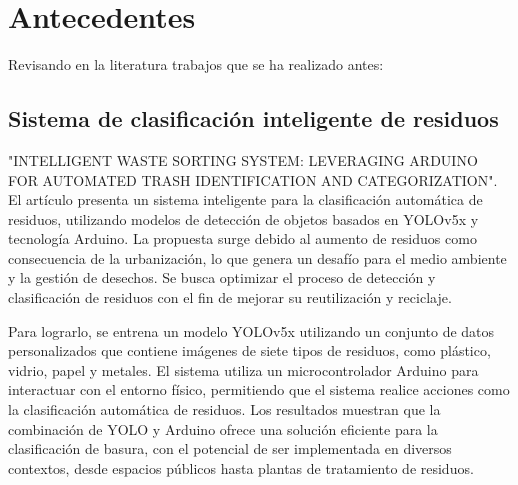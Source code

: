\section{Antecedentes}
Revisando en la literatura trabajos que se ha realizado antes:

\subsection{Sistema de clasificación inteligente de residuos}
"INTELLIGENT WASTE SORTING SYSTEM: LEVERAGING ARDUINO FOR AUTOMATED TRASH IDENTIFICATION AND CATEGORIZATION". El artículo presenta un sistema inteligente para la clasificación automática de residuos, utilizando modelos de detección de objetos basados en YOLOv5x y tecnología Arduino. La propuesta surge debido al aumento de residuos como consecuencia de la urbanización, lo que genera un desafío para el medio ambiente y la gestión de desechos. Se busca optimizar el proceso de detección y clasificación de residuos con el fin de mejorar su reutilización y reciclaje.

Para lograrlo, se entrena un modelo YOLOv5x utilizando un conjunto de datos personalizados que contiene imágenes de siete tipos de residuos, como plástico, vidrio, papel y metales. El sistema utiliza un microcontrolador Arduino para interactuar con el entorno físico, permitiendo que el sistema realice acciones como la clasificación automática de residuos. Los resultados muestran que la combinación de YOLO y Arduino ofrece una solución eficiente para la clasificación de basura, con el potencial de ser implementada en diversos contextos, desde espacios públicos hasta plantas de tratamiento de residuos.~\cite{mohd}